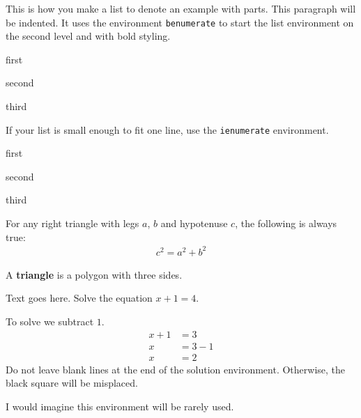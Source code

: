 \documentclass[10pt,oneside]{book}
\begin{document}
This is how you make a list to denote an example with parts. This paragraph will
be indented.  It uses the environment \texttt{benumerate} to start the list
environment on the second level and with bold styling. 
\begin{benumerate}
  \item first
  \item second
  \item third
\end{benumerate}

If your list is small enough to fit one line, use the \texttt{ienumerate}
environment.
\begin{ienumerate}
  \item first
  \item second
  \item third
\end{ienumerate}



\begin{theorem}
  For any right triangle with legs $a$, $b$  and hypotenuse $c$, the following
  is always true:
  \begin{align*}
    c^2 = a^2 + b^2
  \end{align*}
\end{theorem}




\begin{definition}[Triangle]
  A \textbf{triangle} is a polygon with three sides.
\end{definition}


\begin{example}
  Text goes here.  Solve the equation $x +1 = 4$.
\end{example}


\begin{solution}
  To solve we subtract $1$.
  \begin{align*}
    x + 1 &= 3     \\
        x &= 3 - 1 \\
        x &= 2
  \end{align*}
  Do not leave blank lines at the end of the solution environment.
  Otherwise, the black square will be misplaced.
\end{solution}


\begin{exercise}
  I would imagine this environment will be rarely used.
\end{exercise}
\end{document}
